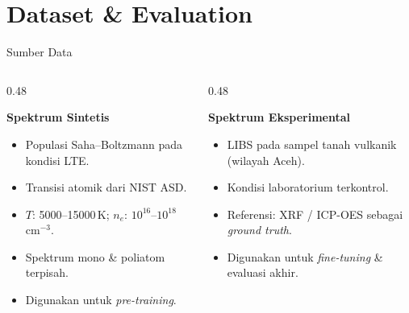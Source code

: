 \documentclass{beamer}
\def\\{}%
\begin{document}
\section{Dataset \& Evaluation}

\begin{frame}{Sumber Data}
  \centering


  \vspace{0.4em}

  \begin{columns}[T,onlytextwidth]
    \begin{column}{0.48\textwidth}
      {\small
      \textbf{Spektrum Sintetis}
      \begin{itemize}\setlength{\itemsep}{2pt}
        \item Populasi Saha--Boltzmann pada kondisi LTE.
        \item Transisi atomik dari NIST ASD.
        \item $T$: 5000--15000\,K; $n_e$: $10^{16}$--$10^{18}$\,cm$^{-3}$.
        \item Spektrum mono \& poliatom terpisah.
        \item Digunakan untuk \textit{pre-training}.
      \end{itemize}
      }
    \end{column}
    \begin{column}{0.48\textwidth}
      {\small
      \textbf{Spektrum Eksperimental}
      \begin{itemize}\setlength{\itemsep}{2pt}
        \item LIBS pada sampel tanah vulkanik (wilayah Aceh).
        \item Kondisi laboratorium terkontrol.
        \item Referensi: XRF / ICP-OES sebagai \textit{ground truth}.
        \item Digunakan untuk \textit{fine-tuning} \& evaluasi akhir.
      \end{itemize}
      }
    \end{column}
  \end{columns}
\end{frame}
\end{document}
